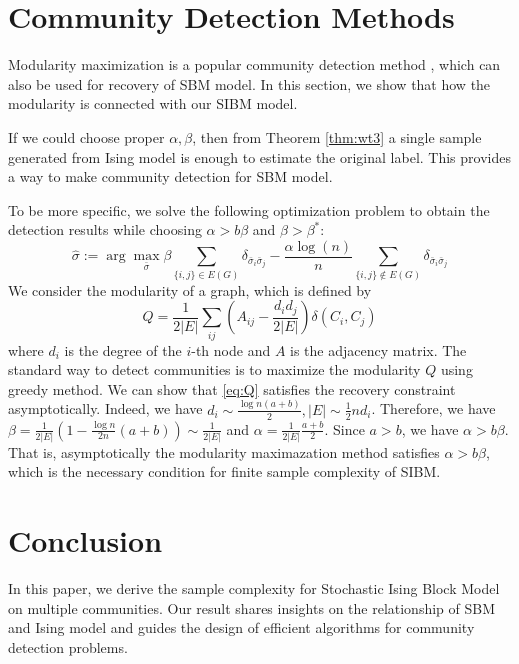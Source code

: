 \documentclass[conference]{IEEEtran}
\newcommand{\ide}[2]{ \delta_{#1 #2} }
\begin{document}
	\section{Community Detection Methods}\label{s:cdm}
	Modularity maximization is a popular community detection method \cite{clauset2004finding}, which can also be used for recovery of SBM model.
	In this section,
	we show that how the modularity is connected with our SIBM model.
	
	If we could choose proper $\alpha, \beta$, then from Theorem \ref{thm:wt3} a single sample generated from Ising model is enough to
	estimate the original label. This provides a way to make community detection for SBM model.

	To be more specific, we solve the following optimization problem to obtain the detection results while choosing $\alpha > b \beta$ and
	$\beta > \beta^*$:
	\begin{equation}\label{eq:hat_sigma}
	\hat{\sigma} := \arg\max_{\bar{\sigma}}\beta \sum_{\{i,j\}\in E(G)} \ide{\bar{\sigma}_i}{\bar{\sigma}_j}
	-\frac{\alpha\log(n)}{n} \sum_{\{i,j\}\notin E(G)} \ide{\bar{\sigma}_i}{\bar{\sigma}_j} 
	\end{equation}
	We consider the modularity of a graph, which is defined by
	\begin{equation}\label{eq:Q}
	Q = \frac{1}{2 |E|} \sum_{ij} (A_{ij} - \frac{d_i d_j}{2 |E|}) \delta(C_i, C_j)
	\end{equation}
	where $d_i$ is the degree of the $i$-th node and $A$ is the adjacency matrix.
	The standard way to detect communities is to maximize the modularity $Q$ using greedy method.
	We can show that \eqref{eq:Q} satisfies the recovery constraint asymptotically.
	Indeed, we have $d_i \sim \frac{\log n(a+b)}{2}, |E| \sim \frac{1}{2}n d_i$. Therefore, we have $\beta = \frac{1}{2|E|}(1-\frac{\log n}{2n}(a+b))
	\sim \frac{1}{2|E|}$
	and $\alpha = \frac{1}{2|E|}\frac{a+b}{2}$. Since $a>b$, we have $\alpha > b \beta$. That is, asymptotically the modularity maximazation method
	satisfies $\alpha > b\beta$, which is the necessary condition for finite sample complexity of SIBM.
	
	\section{Conclusion}\label{s:conclusion}
	In this paper, we derive the sample complexity for Stochastic Ising Block Model on multiple communities.
	Our result shares insights on the relationship of SBM and Ising model and guides the design of efficient algorithms
	for community detection problems.
\end{document}
